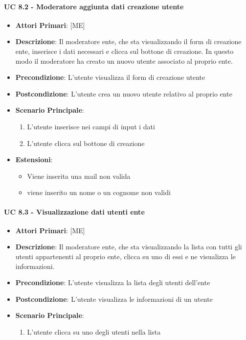		\paragraph{UC 8.2 - Moderatore aggiunta dati creazione utente}
			\begin{itemize}
				\item \textbf{Attori Primari}: [ME]
				\item \textbf{Descrizione}: Il moderatore ente, che sta visualizzando il form di creazione ente, inserisce i dati necessari e clicca sul bottone di creazione. In questo modo il moderatore ha creato un nuovo utente associato al proprio ente. 
				\item \textbf{Precondizione}: L'utente visualizza il form di creazione utente
				\item \textbf{Postcondizione}: L'utente crea un nuovo utente relativo al proprio ente 
				\item \textbf{Scenario Principale}:
				\begin{enumerate}
					\item{L'utente inserisce nei campi di input i dati}
					\item{L'utente clicca sul bottone di creazione}
				\end{enumerate}
				\item \textbf{Estensioni}:
					\begin{itemize}
						\item Viene inserita una mail non valida
						\item viene inserito un nome o un cognome non validi
					\end{itemize}	
			\end{itemize}	

		\paragraph{UC 8.3 - Visualizzazione dati utenti ente}
			\begin{itemize}
				\item \textbf{Attori Primari}: [ME] 
				\item \textbf{Descrizione}: Il moderatore ente, che sta visualizzando la lista con tutti gli utenti appartenenti al proprio ente, clicca su uno di essi e ne visualizza le informazioni.
				\item \textbf{Precondizione}: L'utente visualizza la lista degli utenti dell'ente
				\item \textbf{Postcondizione}: L'utente visualizza le informazioni di un utente
				\item \textbf{Scenario Principale}:
				\begin{enumerate}
					\item{L'utente clicca su uno degli utenti nella lista}
				\end{enumerate}	
			\end{itemize}

